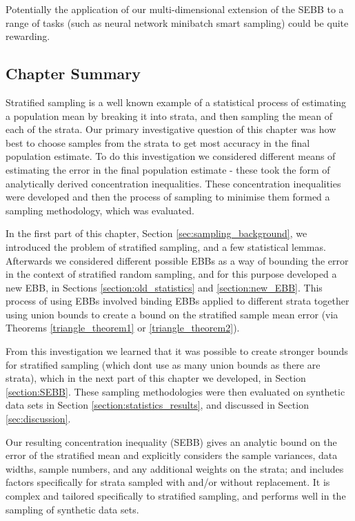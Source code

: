 Potentially the application of our multi-dimensional extension of the SEBB to a range of tasks (such as neural network minibatch smart sampling) could be quite rewarding.


\subsection{Chapter Summary}

Stratified sampling is a well known example of a statistical process of estimating a population mean by breaking it into strata, and then sampling the mean of each of the strata.
Our primary investigative question of this chapter was how best to choose samples from the strata to get most accuracy in the final population estimate.
To do this investigation we considered different means of estimating the error in the final population estimate - these took the form of analytically derived concentration inequalities.
These concentration inequalities were developed and then the process of sampling to minimise them formed a sampling methodology, which was evaluated.

In the first part of this chapter, Section \ref{sec:sampling_background}, we introduced the problem of stratified sampling, and a few statistical lemmas.
Afterwards we considered different possible EBBs as a way of bounding the error in the context of stratified random sampling, and for this purpose developed a new EBB, in Sections \ref{section:old_statistics} and \ref{section:new_EBB}.
This process of using EBBs involved binding EBBs applied to different strata together using union bounds to create a bound on the stratified sample mean error (via Theorems \ref{triangle_theorem1} or \ref{triangle_theorem2}).

From this investigation we learned that it was possible to create stronger bounds for stratified sampling (which dont use as many union bounds as there are strata), which in the next part of this chapter we developed, in Section \ref{section:SEBB}.
These sampling methodologies were then evaluated on synthetic data sets in Section \ref{section:statistics_results}, and discussed in Section \ref{sec:discussion}.

Our resulting concentration inequality (SEBB) gives an analytic bound on the error of the stratified mean and explicitly considers the sample variances, data widths, sample numbers, and any additional weights on the strata; and includes factors specifically for strata sampled with and/or without replacement.
It is complex and tailored specifically to stratified sampling, and performs well in the sampling of synthetic data sets.

